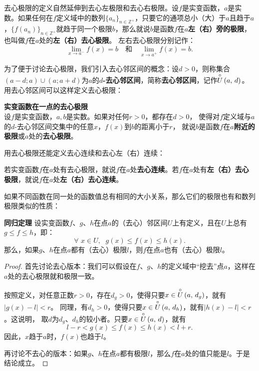 \documentclass[12pt,UTF8,fontset=none]{ctexbook}
\begin{document}
\begin{appendix}
去心极限的定义自然延伸到去心左极限和去心右极限。设$f$是实变函数，$a$是实数。如果任何在$f$定义域中的数列$\{a_n\}_{n\in\mathbb{Z}^+}$，只要它的通项总小（大）于$a$且趋于$a$，$\{f(a_n)\}_{n\in\mathbb{Z}^+}$就趋于同一个极限$b$，那么就说$b$是函数$f$在$a$\textbf{左（右）旁的极限}，也叫做$f$在$a$处的\textbf{左（右）去心极限}。
左右去心极限分别记作：
$$  \lim_{x \to a^-} f(x) = b \quad \mbox{和} \quad \lim_{x \to a^+} f(x) = b. $$

为了便于讨论去心极限，我们引入去心邻区间的概念：设$d>0$，则称集合$(a-d;a)\cup(a;a+d)$为$a$的$d$\textbf{-去心邻区间}，简称\textbf{去心邻区间}，记作$\overset{\circ}{U}\left(a,\,d\right)$。用去心邻区间可以这样定义去心极限：
\begin{df}{\textbf{实变函数在一点的去心极限}}\\
    设$f$是实变函数，$a, b$是实数。如果对任何$r>0$，都存在$d>0$，
    使得对$f$定义域与$a$的$d$-去心邻区间交集中的任意$x$，$f(x)$到$b$的距离小于$r$，
    就说$b$是函数$f$在$a$\textbf{附近的极限}或$a$处的\textbf{去心极限}。    
\end{df}
用去心极限还能定义去心连续和去心左（右）连续：
\begin{df}
    若实变函数$f$在$a$处有去心极限，就说$f$在$a$处\textbf{去心连续}。若$f$在$a$处有\textbf{左（右）去心极限}，就说$f$在$a$处\textbf{左（右）去心连续}。
\end{df}

如果不同函数在同一处的函数值总有相同的大小关系，那么它们的极限也有和数列极限类似的性质：
\begin{tm}{\textbf{同归定理}}\label{tm:b-0-20}
    设实变函数$f$、$g$、$h$在点$a$的（去心）邻区间$U$上有定义，且在$U$上总有$g \leqslant f \leqslant h $，即：
    $$ \forall \,\,x\in U,\;\,\, g(x) \leqslant f(x) \leqslant h(x).  $$
    那么，如果$g$、$h$在点$a$都有（去心）极限$l$，则$f$在点$a$也有（去心）极限$l$。
\end{tm}
\begin{proof}
    首先讨论去心版本：我们可以假设在$f$、$g$、$h$的定义域中“挖去”点$a$，这样在$a$处的去心极限就和极限一致。

    按照定义，对任意正数$r>0$，存在$d_g>0$，使得只要$x\in\overset{\circ}{U}\left(a,\,d_g\right)$，就有$|g(x) - l|<r$。
    同理，有$d_h>0$，使得只要$x\in\overset{\circ}{U}\left(a,\,d_h\right)$，就有$|h(x) - l|<r$。这说明，
    取$d$为$d_g$、$d_h$的较小者。只要$x\in\overset{\circ}{U}\left(a,\,d\right)$，就有
    $$ l - r < g(x) \leqslant f(x) \leqslant h(x) < l + r. $$
    因此，$x$趋于$a$时，$f(x)$也趋于$l$。

    再讨论不去心的版本：如果$g$、$h$在点$a$都有极限$l$，那么$f$在$a$处的值只能是$l$。于是结论成立。
\end{proof}


\end{appendix}
\end{document}

